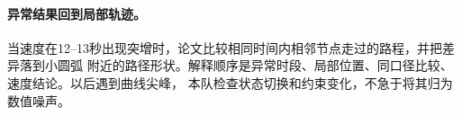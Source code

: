 \paragraph{异常结果回到局部轨迹。}
当速度在12--13秒出现突增时，论文比较相同时间内相邻节点走过的路程，并把差异落到小圆弧
附近的路径形状。解释顺序是异常时段、局部位置、同口径比较、速度结论。以后遇到曲线尖峰，
本队检查状态切换和约束变化，不急于将其归为数值噪声。

